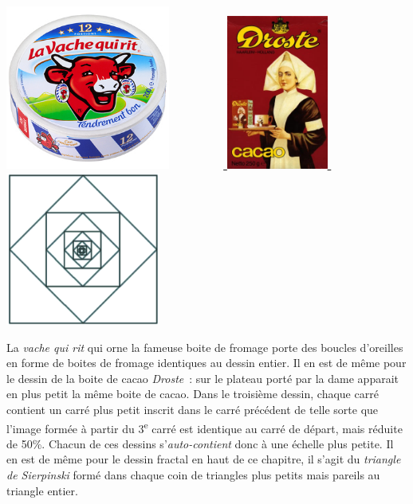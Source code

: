 	{
	 \includegraphics[width=5.41cm,height=5.41cm]{image/a2012Logique2eme-img016.jpg} 
	\ \ \ \ \ \ \ \ \ 
	\href{http://upload.wikimedia.org/wikipedia/commons/6/62/Droste.jpg}{
	\includegraphics[width=3.328cm,height=5.098cm]{image/a2012Logique2eme-img017.jpg} } 
	\ \ \ \ \ \ \ \ \ 
	\includegraphics[width=5.089cm,height=5.052cm]{image/a2012Logique2eme-img018.png} }


	La \textit{vache qui rit} qui orne la fameuse boite 
	de fromage porte des boucles d'oreilles en forme de boites de
	fromage identiques au dessin entier. Il en est de même pour 
	le dessin de la boite de cacao \textit{Droste}~: sur le
	plateau porté par la dame apparait en plus petit la même 
	boite de cacao. Dans le troisième dessin, chaque carré
	contient un carré plus petit inscrit dans le carré précédent 
	de telle sorte que l'image formée à partir du 3\textsuperscript{e} 
	carré est identique au carré de départ, mais réduite de 50\%. 
	Chacun de ces dessins s'\textit{auto-contient} donc à une échelle 
	plus petite. Il en est de même pour le dessin fractal en haut de
	ce chapitre, il s'agit du \textit{triangle de Sierpinski} 
	formé dans chaque coin de triangles plus petits mais pareils
	au triangle entier.


